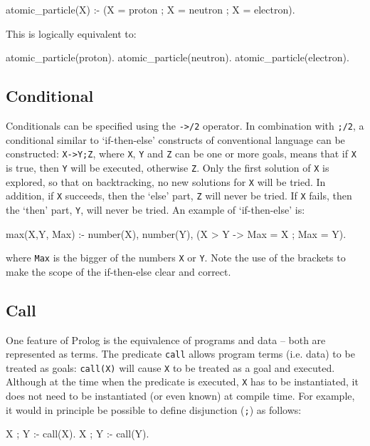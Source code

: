 \begin{code}
atomic_particle(X) :- (X = proton ; X = neutron ; X = electron).
\end{code}

This is logically equivalent to: 

\begin{code}
atomic_particle(proton).
atomic_particle(neutron).
atomic_particle(electron).
\end{code}

    \subsection{Conditional}

 
Conditionals can be specified using the \verb'->/2' operator.
In combination with \verb';/2', a conditional similar to `if-then-else' 
constructs of conventional language can be constructed:
\verb'X->Y;Z', where \verb'X', \verb'Y' and \verb'Z' can be one or more
goals,  means that if \verb'X' is true, then \verb'Y' will be
executed, otherwise \verb'Z'. Only the first solution of \verb'X' is
explored, so that on backtracking, no new solutions for \verb'X' will be
tried. In addition, if \verb'X' succeeds, then the `else' part, \verb'Z'
will never be tried. If \verb'X' fails, then the `then' part, \verb'Y',
will never be tried. An example of `if-then-else' is:
\begin{code}
max(X,Y, Max) :- 
   number(X), number(Y),
   (X > Y -> Max = X ; Max = Y).
\end{code}
where \verb'Max' is the bigger of the numbers \verb'X' or \verb'Y'.
Note the use of the brackets to make the scope of the if-then-else
clear and correct.


    \subsection{Call} 
One feature of Prolog is the equivalence of  programs and data -- both are
represented as terms. The predicate \verb'call' allows 
program terms (i.e. data) to be treated as goals: \verb'call(X)' will cause
\verb'X' to be treated as a goal and executed. Although at the time when 
the predicate is executed, \verb'X' has to be instantiated, it does not 
need to be instantiated (or even known) at compile time. For example, it
would in principle be
possible to define disjunction (\verb';') as follows:

\begin{code}
X ; Y :- call(X).
X ; Y :- call(Y).
\end{code}

